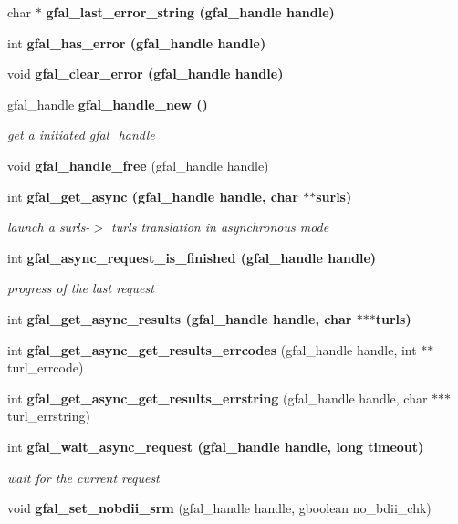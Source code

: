 \begin{CompactItemize}
\item 
char $\ast$ \bf{gfal\_\-last\_\-error\_\-string} (gfal\_\-handle handle)
\item 
int \bf{gfal\_\-has\_\-error} (gfal\_\-handle handle)
\item 
void \bf{gfal\_\-clear\_\-error} (gfal\_\-handle handle)
\item 
gfal\_\-handle \bf{gfal\_\-handle\_\-new} ()
\begin{CompactList}\small\item\em get a initiated gfal\_\-handle \item\end{CompactList}\item 
void \textbf{gfal\_\-handle\_\-free} (gfal\_\-handle handle)\label{gfal__common__interface_8h_0071cb3665f7dca9648fa46bebeca524}

\item 
int \bf{gfal\_\-get\_\-async} (gfal\_\-handle handle, char $\ast$$\ast$surls)
\begin{CompactList}\small\item\em launch a surls-$>$ turls translation in asynchronous mode \item\end{CompactList}\item 
int \bf{gfal\_\-async\_\-request\_\-is\_\-finished} (gfal\_\-handle handle)
\begin{CompactList}\small\item\em progress of the last request \item\end{CompactList}\item 
int \bf{gfal\_\-get\_\-async\_\-results} (gfal\_\-handle handle, char $\ast$$\ast$$\ast$turls)
\item 
int \textbf{gfal\_\-get\_\-async\_\-get\_\-results\_\-errcodes} (gfal\_\-handle handle, int $\ast$$\ast$turl\_\-errcode)\label{gfal__common__interface_8h_a3161f12f9d5c8151f44df4f132602cb}

\item 
int \textbf{gfal\_\-get\_\-async\_\-get\_\-results\_\-errstring} (gfal\_\-handle handle, char $\ast$$\ast$$\ast$turl\_\-errstring)\label{gfal__common__interface_8h_ecd7d68b18088ff620d21dbef85862ae}

\item 
int \bf{gfal\_\-wait\_\-async\_\-request} (gfal\_\-handle handle, long timeout)
\begin{CompactList}\small\item\em wait for the current request \item\end{CompactList}\item 
void \textbf{gfal\_\-set\_\-nobdii\_\-srm} (gfal\_\-handle handle, gboolean no\_\-bdii\_\-chk)\label{gfal__common__interface_8h_5e3afd0690b23dedf14d6fa7898f28a9}


\end{CompactItemize}
